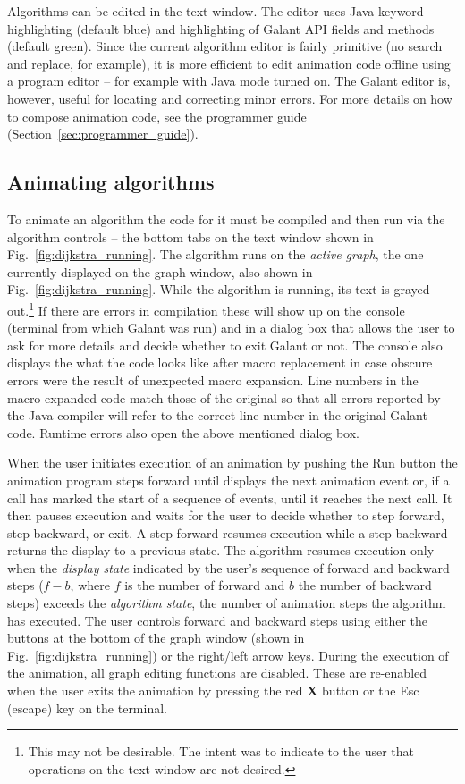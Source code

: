 Algorithms can be edited in the text window. The
editor uses Java keyword highlighting (default blue) and
highlighting of Galant API fields and methods (default green).
Since the current algorithm editor is fairly primitive (no search and replace, for example),
it is more efficient to edit animation code offline using a program editor --
for example  with Java mode turned on.
The Galant editor is, however, useful for locating and correcting minor errors.
For more details on how to compose animation code, see the programmer guide
(Section~\ref{sec:programmer_guide}).

\subsection{Animating algorithms}
\label{sec:animating_algorithms}



To animate an algorithm the code for it must be compiled and then run via the
algorithm controls
 -- the bottom tabs on the text window shown in Fig.~\ref{fig:dijkstra_running}.
The algorithm runs on the \emph{active graph}, the one currently displayed
on the graph window, also shown in Fig.~\ref{fig:dijkstra_running}.
While the algorithm is running, its text is grayed out.\footnote{
  This may not be desirable. The intent was to indicate to the user that
  operations on the text window are not desired.
  }
If there are errors in compilation these will show up on the console (terminal
from which Galant was run) and in a dialog box that allows the user to ask for more details
and decide whether to exit Galant or not.
The console also displays the what the code looks like after macro replacement
in case obscure errors were the result of unexpected macro expansion.
Line numbers in the macro-expanded code match those of the original so that
all errors reported by the Java compiler will refer to the correct line number
in the original Galant code.
Runtime errors also open the above mentioned
dialog box.

When the user initiates execution of an animation by pushing the \textsf{Run}
button
the animation program
steps forward until
displays the next animation event or, if a 
call has marked the start of a sequence of events, until
it reaches the next  call.
It then pauses execution and waits for the user to decide whether to
step forward, step backward, or exit.
A step forward resumes execution while a step backward returns the display to a previous
state.
The algorithm resumes execution only when the \emph{display state}
indicated by the user's sequence of forward and backward steps
($f-b$, where $f$ is the number of forward and $b$ the number of backward steps)
exceeds the \emph{algorithm state}, the number of animation steps the algorithm
has executed.
The user controls forward and backward steps using either the buttons at the
bottom of the graph window (shown in Fig.~\ref{fig:dijkstra_running})
or the right/left arrow keys.
During the execution of the animation, all graph editing functions are disabled.
These are re-enabled when the user exits the animation by pressing the red \textbf{X} button or the \textsf{Esc} (escape) key on the terminal.

